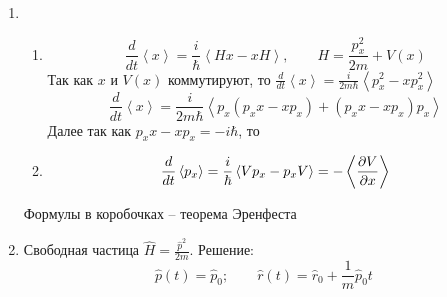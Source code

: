 \documentclass[12pt]{customArticle}
\begin{document}
\begin{enumerate}[label=\asbuk*)]
			\item {
				\begin{enumerate}[label=\arabic*)]
					\item{
						\[
							\frac{d}{dt} \left< x \right> = \frac{i}{\hbar} \left< Hx - xH\right>, \qquad H = \frac{p^2_x}{2m} + V(x)
						\]
						Так как $x$ и $V(x)$ коммутируют, то $\frac{d}{dt} \left< x \right> = \frac{i}{2m \hbar} \left< p^2_x - x p^2_x\right> $
						\[
							\frac{d}{dt} \left< x \right> = \frac{i}{2m \hbar} \left< p_x \left(p_x x - x p_x\right) + \left(p_x x - x p_x\right) p_x \right>
						\]
						Далее так как $p_x x - x p_x = -i \hbar$, то 
					}
					\item{
						\[
							\frac{d}{dt} \left< p_x \right> = \frac{i}{\hbar} \left< V p_x - p_x V \right> = - \Braket{\frac{\partial V}{\partial x}}
						\]
						\begin{center}
						\end{center}
					}
				\end{enumerate}
				Формулы в коробочках -- теорема Эренфеста
			}
			\item{
				Свободная частица $\displaystyle \widehat H = \frac{\widehat p^2}{2m}$. Решение: 
				\[
					\widehat p (t) = \widehat p_0; \qquad \widehat r (t) = \widehat r_0 + \frac{1}{m} \widehat p_0 t
				\]
			}
		\end{enumerate}
	
				
		
		
		
		
		
		
		
		
		
		
		
		
		
		
		
		
		
		
		
		
		
		
		
		
		
		
		
		
		
		
		
		
		
		
		
		
		
		
		
\end{document}
